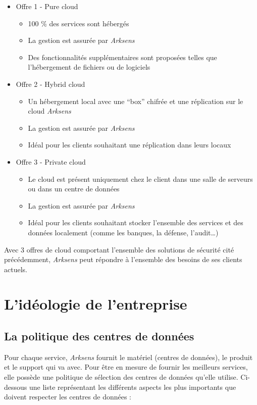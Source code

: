 \documentclass[a4paper,10pt, twoside]{report}
\begin{document}
\begin{spacing}{1.2}
\begin{itemize}
  \item Offre 1 - Pure cloud
  \noindent
  \begin{itemize}
    \item 100 \% des services sont hébergés
    \item La gestion est assurée par \textit{Arksens}
    \item Des fonctionnalités supplémentaires sont proposées telles que
    l'hébergement de fichiers ou de logiciels
  \end{itemize}
  \item Offre 2 - Hybrid cloud
  \noindent
  \begin{itemize}
    \item Un hébergement local avec une ``box'' chifrée et une
    réplication sur le cloud \textit{Arksens}
    \item La gestion est assurée par \textit{Arksens}
    \item Idéal pour les clients souhaitant une réplication dans leurs
    locaux
  \end{itemize}
  \item Offre 3 - Private cloud
  \noindent
  \begin{itemize}
    \item Le cloud est présent uniquement chez le client dans une salle de
    serveurs ou dans un centre de données
    \item La gestion est assurée par \textit{Arksens}
    \item Idéal pour les clients souhaitant stocker l'ensemble des services
    et des données localement (comme les banques, la défense,
    l'audit\ldots{})
  \end{itemize}
\end{itemize}

Avec 3 offres de cloud comportant l'ensemble des solutions de sécurité
cité précédemment, \textit{Arksens} peut répondre à l'ensemble des besoins
de ses clients actuels.

\section{L'idéologie de l'entreprise}
\subsection{La politique des centres de données}

Pour chaque service, \textit{Arksens} fournit le matériel (centres de
données), le produit et le support qui va avec. Pour être en mesure de
fournir les meilleurs services, elle possède une politique de sélection des
centres de données qu'elle utilise. Ci-dessous une liste représentant les
différents aspects les plus importants que doivent respecter les centres de
données :


\end{spacing}
\end{document}
